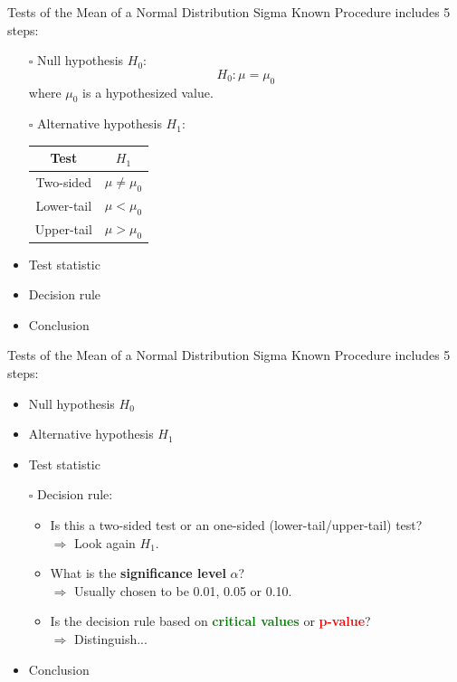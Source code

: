 \documentclass[
  10pt,
  ignorenonframetext,
]{beamer}
\begin{document}
\begin{frame}{Tests of the Mean of a Normal Distribution Sigma Known}
\protect\hypertarget{tests-of-the-mean-of-a-normal-distribution-sigma-known-5}{}
Procedure includes 5 steps:

\begin{itemize}
    \item [$\square$] Null hypothesis $H_0$:\\
    $$
    H_0: \mu = \mu_{0}
    $$
    where $\mu_{0}$ is a hypothesized value.
    \item [$\square$] Alternative hypothesis $H_1$:
    \vspace{2mm}
    \begin{center}
    \begin{tabular}{|c|c|}
    \hline
    Test & $H_1$\\
    \hline
    Two-sided &  $\mu \neq \mu_{0}$ \\
    \hline 
    Lower-tail & $\mu < \mu_{0}$\\
    \hline 
    Upper-tail & $\mu > \mu_{0}$\\ 
    \hline
    \end{tabular}
    \end{center}
    \vspace{2mm}
    \item Test statistic
    \item Decision rule
    \item Conclusion
\end{itemize}
\end{frame}

\begin{frame}{Tests of the Mean of a Normal Distribution Sigma Known}
\protect\hypertarget{tests-of-the-mean-of-a-normal-distribution-sigma-known-6}{}
Procedure includes 5 steps:

\begin{itemize}
    \item Null hypothesis $H_0$
    \item Alternative hypothesis $H_1$
    \item Test statistic
    \item [$\square$] Decision rule:
    \begin{itemize}
        \item Is this a two-sided test or an one-sided (lower-tail/upper-tail) test?\\
        $\Longrightarrow$ Look again $H_1$.
        \item What is the \textbf{significance level} $\alpha$?\\
        $\Longrightarrow$ Usually chosen to be 0.01, 0.05 or 0.10.
        \item Is the decision rule based on \textcolor{green}{\textbf{critical values}} or \textcolor{red}{\textbf{p-value}}?\\
        $\Longrightarrow$ Distinguish...
    \end{itemize}
    \item Conclusion
\end{itemize}
\end{frame}
\end{document}

